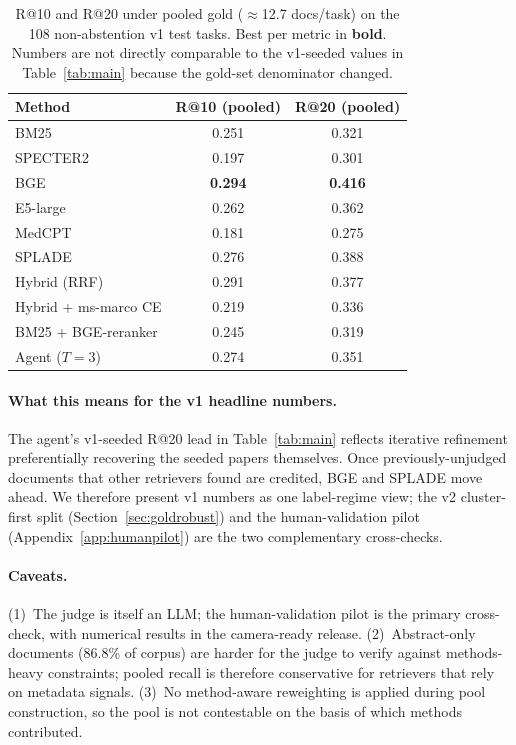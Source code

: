 \documentclass{article}
\begin{document}
\begin{table}[ht]
\centering
\caption{R@10 and R@20 under pooled gold ($\approx$12.7 docs/task) on the 108 non-abstention v1 test tasks. Best per metric in \textbf{bold}. Numbers are not directly comparable to the v1-seeded values in Table~\ref{tab:main} because the gold-set denominator changed.}
\label{tab:pooled}
\small
\begin{tabular}{lcc}
\toprule
\textbf{Method} & \textbf{R@10 (pooled)} & \textbf{R@20 (pooled)} \\
\midrule
BM25                  & 0.251 & 0.321 \\
SPECTER2              & 0.197 & 0.301 \\
BGE                   & \textbf{0.294} & \textbf{0.416} \\
E5-large              & 0.262 & 0.362 \\
MedCPT                & 0.181 & 0.275 \\
SPLADE                & 0.276 & 0.388 \\
Hybrid (RRF)          & 0.291 & 0.377 \\
Hybrid + ms-marco CE  & 0.219 & 0.336 \\
BM25 + BGE-reranker   & 0.245 & 0.319 \\
Agent ($T{=}3$)       & 0.274 & 0.351 \\
\bottomrule
\end{tabular}
\end{table}

\paragraph{What this means for the v1 headline numbers.} The agent's v1-seeded R@20 lead in Table~\ref{tab:main} reflects iterative refinement preferentially recovering the seeded papers themselves. Once previously-unjudged documents that other retrievers found are credited, BGE and SPLADE move ahead. We therefore present v1 numbers as one label-regime view; the v2 cluster-first split (Section~\ref{sec:goldrobust}) and the human-validation pilot (Appendix~\ref{app:humanpilot}) are the two complementary cross-checks.

\paragraph{Caveats.} (1)~The judge is itself an LLM; the human-validation pilot is the primary cross-check, with numerical results in the camera-ready release. (2)~Abstract-only documents (86.8\% of corpus) are harder for the judge to verify against methods-heavy constraints; pooled recall is therefore conservative for retrievers that rely on metadata signals. (3)~No method-aware reweighting is applied during pool construction, so the pool is not contestable on the basis of which methods contributed.
\end{document}
